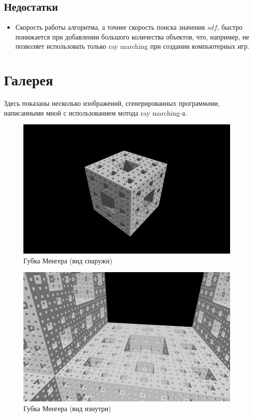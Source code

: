 \documentclass[12pt,a4paper]{article}
\begin{document}
\subsection{Недостатки}
\begin{itemize}
    \item Скорость работы алгоритма, а точнее скорость поиска значения $sdf$,
        быстро понижается при добавлении большого количества объектов,
        что, например, не позволяет использовать только ray marching при
        создании компьютерных игр.
\end{itemize}


\section{Галерея}
Здесь показаны несколько изображений, сгенерированных программами,
написанными мной с использованием мотода ray marching-а.

\begin{figure}[H]
    \centering
    \includegraphics[width=\textwidth]{gallery2.png}
    \caption{Губка Менгера (вид снаружи)}
\end{figure}

\begin{figure}[H]
    \centering
    \includegraphics[width=\textwidth]{gallery3.png}
    \caption{Губка Менгера (вид изнутри)}
\end{figure}
\end{document}
